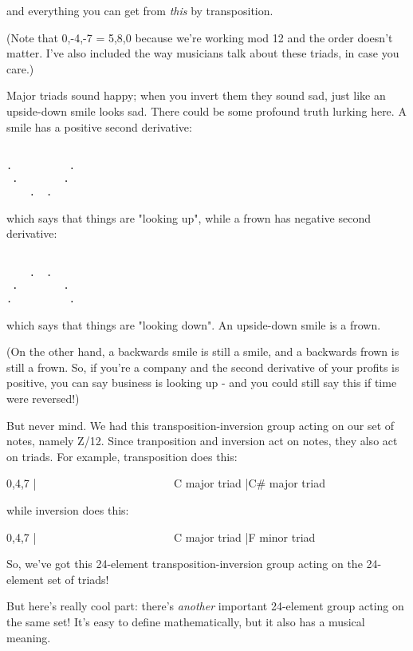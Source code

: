 and everything you can get from \emph{this} by transposition.  

(Note that {0,-4,-7} = {5,8,0} because we're working mod 12
and the order doesn't matter.  I've also included the way musicians
talk about these triads, in case you care.)

Major triads sound happy; when you invert them they sound sad, 
just like an upside-down smile looks sad.  There could be some
profound truth lurking here.  A smile has a positive second 
derivative:


\begin{verbatim}

.          .
 .        .
    .  .
\end{verbatim}
    
which says that things are "looking up", while a frown has negative 
second derivative:


\begin{verbatim}

    .  .
 .        .
.          .
\end{verbatim}
    
which says that things are "looking down".  An upside-down smile
is a frown.  

(On the other hand, a backwards smile is still a smile, and a 
backwards frown is still a frown.  So, if you're a company and 
the second derivative of your profits is positive, you can say 
business is looking up - and you could still say this if time 
were reversed!)

But never mind.  We had this transposition-inversion group acting 
on our set of notes, namely Z/12.  Since tranposition and inversion
act on notes, they also act on triads.  For example, transposition 
does this:

{0,4,7} |               
\ \ \ \ \ \ \ \ \ \ \ \       
\ \ \ \ \ \ \ \ \ \ \ \       
 C major triad |\to  C# major triad

while inversion does this:

{0,4,7} |  
\ \ \ \ \ \ \ \ \ \ \ \       
\ \ \ \ \ \ \ \ \ \ \ \       
              C major triad |\to  F minor triad

So, we've got this 24-element transposition-inversion group 
acting on the 24-element set of triads!   

But here's really cool part: there's \emph{another} important 
24-element group acting on the same set!  It's easy to define 
mathematically, but it also has a musical meaning.

